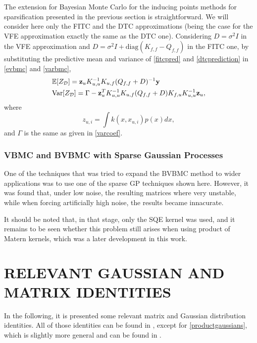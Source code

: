 The extension for Bayesian Monte Carlo for the inducing points methods for sparsification presented in the previous section is straightforward. We will consider here only the FITC and the DTC approximations (being the case for the VFE approximation exactly the same as the DTC one). Considering $D = \sigma^2 I$ in the VFE approximation and $D = \sigma^2 I + \text{diag}(K_{f,f} - Q_{f,f})$ in the FITC one, by substituting the predictive mean and variance of \eqref{fitcpred} and \eqref{dtcprediction} in \eqref{evbmc} and \eqref{varbmc}, 
\begin{equation}
\begin{split}
& {\mathbb E}[Z_\mathcal{D}] = \mathbf{z}_u K_{u,u}^{-1} K_{u,f} (Q_{f,f} + D)^{-1} {\mathbf y} \\
& \mathrm{Var}[Z_{\mathcal{D}}] = \Gamma - \mathbf{z}_u^T K_{u,u}^{-1} K_{u,f} (Q_{f,f} + D) K_{f,u} K_{u,u}^{-1} \mathbf{z}_u,
\end{split}
\end{equation}
where
\begin{equation}
z_{u,i} = \int k(x,x_{u,i}) p(x) dx,
\end{equation}
and $\Gamma$ is the same as given in \eqref{varcoef}.

\subsection{VBMC and BVBMC with Sparse Gaussian Processes}
One of the techniques that was tried to expand the BVBMC method to wider applications was to use one of the sparse GP techniques shown here. However, it was found that, under low noise, the resulting matrices where very unstable, while when forcing artificially high noise, the results became innacurate.

It should be noted that, in that stage, only the SQE kernel was used, and it remains to be seen whether this problem still arises when using product of Matern kernels, which was a later development in this work.


\chapter{RELEVANT GAUSSIAN AND MATRIX IDENTITIES}

In the following, it is presented some relevant matrix and Gaussian distribution identities. All of those identities can be found in \cite{Petersen_2012}, except for \eqref{productgaussians}, which is slightly more general and can be found in \cite{Candela_2005}.
